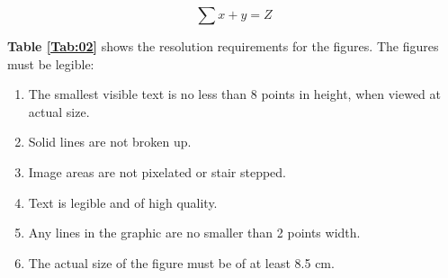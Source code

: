\begin{equation}
\sum x+ y =Z\label{eq:01}
\end{equation}

\textbf{Table \ref{Tab:02}} shows the resolution requirements for the figures. The figures must be legible:
\begin{enumerate}
\item The smallest visible text is no less than 8 points in height, when viewed at actual size.
\item Solid lines are not broken up.
\item Image areas are not pixelated or stair stepped.
\item Text is legible and of high quality.
\item Any lines in the graphic are no smaller than 2 points width.
\item The actual size of the figure must be of at least 8.5 cm.
\end{enumerate}